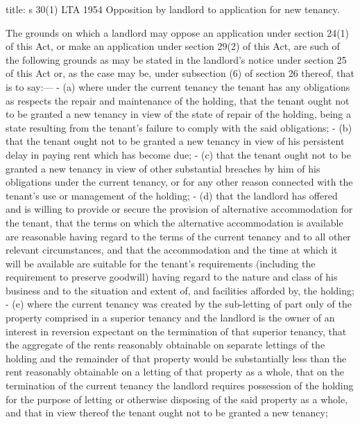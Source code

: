 \documentclass[
]{article}
\newenvironment{Shaded}{}{}
\newcommand{\NormalTok}[1]{#1}
\begin{document}
\begin{Shaded}
\begin{Highlighting}[]
\NormalTok{title: s 30(1) LTA 1954  Opposition by landlord to application for new tenancy.}

\NormalTok{The grounds on which a landlord may oppose an application under section 24(1) of this Act, or make an application under section 29(2) of this Act, are such of the following grounds as may be stated in the landlord’s notice under section 25 of this Act or, as the case may be, under subsection (6) of section 26 thereof, that is to say:—}
\NormalTok{{-} (a) where under the current tenancy the tenant has any obligations as respects the repair and maintenance of the holding, that the tenant ought not to be granted a new tenancy in view of the state of repair of the holding, being a state resulting from the tenant’s failure to comply with the said obligations;}
\NormalTok{{-} (b) that the tenant ought not to be granted a new tenancy in view of his persistent delay in paying rent which has become due;}
\NormalTok{{-} (c) that the tenant ought not to be granted a new tenancy in view of other substantial breaches by him of his obligations under the current tenancy, or for any other reason connected with the tenant’s use or management of the holding;}
\NormalTok{{-} (d) that the landlord has offered and is willing to provide or secure the provision of alternative accommodation for the tenant, that the terms on which the alternative accommodation is available are reasonable having regard to the terms of the current tenancy and to all other relevant circumstances, and that the accommodation and the time at which it will be available are suitable for the tenant’s requirements (including the requirement to preserve goodwill) having regard to the nature and class of his business and to the situation and extent of, and facilities afforded by, the holding;}
\NormalTok{{-} (e) where the current tenancy was created by the sub{-}letting of part only of the property comprised in a superior tenancy and the landlord is the owner of an interest in reversion expectant on the termination of that superior tenancy, that the aggregate of the rents reasonably obtainable on separate lettings of the holding and the remainder of that property would be substantially less than the rent reasonably obtainable on a letting of that property as a whole, that on the termination of the current tenancy the landlord requires possession of the holding for the purpose of letting or otherwise disposing of the said property as a whole, and that in view thereof the tenant ought not to be granted a new tenancy;}

\end{Highlighting}
\end{Shaded}
\end{document}

